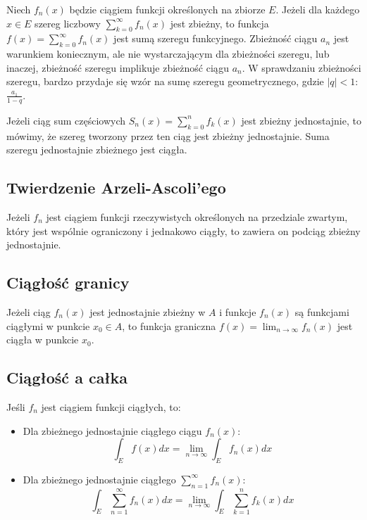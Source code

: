 \documentclass{../notatki}
\begin{document}
Niech $f_n(x)$ będzie ciągiem funkcji określonych na zbiorze $E$. Jeżeli dla
każdego $x \in E$ szereg liczbowy $\sum_{k=0}^\infty f_n(x)$ jest zbieżny, to
funkcja $f(x) = \sum_{k=0}^\infty f_n(x)$ jest sumą szeregu
funkcyjnego. Zbieżność ciągu $a_n$ jest warunkiem koniecznym, ale nie
wystarczającym dla zbieżności szeregu, lub inaczej, zbieżność szeregu
implikuje zbieżność ciągu $a_n$. W sprawdzaniu zbieżności szeregu, bardzo
przydaje się wzór na sumę szeregu geometrycznego, gdzie $|q| < 1$:
$\frac{a_1}{1-q}$.

Jeżeli ciąg sum częściowych $S_n(x) = \sum_{k=0}^n f_k(x)$ jest zbieżny
jednostajnie, to mówimy, że szereg tworzony przez ten ciąg jest zbieżny
jednostajnie. Suma szeregu jednostajnie zbieżnego jest ciągła.

\subsection{Twierdzenie Arzeli-Ascoli'ego}

Jeżeli $f_n$ jest ciągiem funkcji rzeczywistych określonych na przedziale
zwartym, który jest wspólnie ograniczony i jednakowo ciągły, to zawiera
on podciąg zbieżny jednostajnie.


\subsection{Ciągłość granicy}

Jeżeli ciąg $f_n(x)$ jest jednostajnie zbieżny w $A$ i funkcje $f_n(x)$ są
funkcjami ciągłymi w punkcie $x_0 \in A$, to funkcja graniczna $f(x)
= \lim_{n \to \infty} f_n(x)$ jest ciągła w punkcie $x_0$.

\subsection{Ciągłość a całka}

Jeśli $f_n$ jest ciągiem funkcji ciągłych, to:
\begin{itemize}
  \item Dla zbieżnego jednostajnie ciągłego ciągu $f_n(x)$:
    $$
    \int_E f(x) dx = \lim_{n \to \infty} \int_E f_n(x) dx
    $$
  \item Dla zbieżnego jednostajnie ciągłego $\sum_{n=1}^\infty f_n(x)$:
    $$
    \int_E \sum_{n=1}^\infty f_n(x) dx = \lim_{n \to \infty} \int_E
    \sum_{k=1}^n f_k(x) dx
    $$
\end{itemize}
\end{document}
